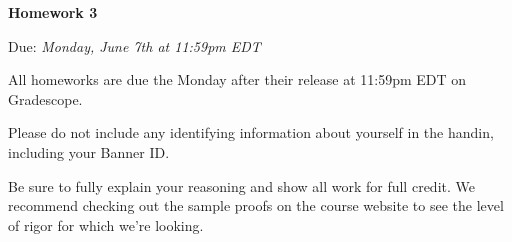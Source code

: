 \documentclass[12pt,letterpaper]{article}
\begin{document}
  \thispagestyle{firstpagestyle}
  \begin{center}
    {\huge \textbf{Homework 3}}

    {\large Due:\textit{ Monday, June 7th at 11:59pm EDT}}
  \end{center}


     All homeworks are due the Monday after their release at 11:59pm EDT on Gradescope.

    Please do not include any identifying information about yourself in the handin, including your Banner ID.

    Be sure to fully explain your reasoning and show all work for full credit. We recommend checking out the sample proofs on the course website to see the level of rigor for which we're looking.
  
  
  
\end{document}
